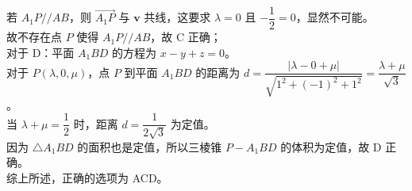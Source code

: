 {  若 \(A_1P // AB\)，则 \(\overrightarrow{A_1P}\) 与 \(\boldsymbol{v}\) 共线，这要求 \(\lambda = 0\) 且 \(-\dfrac{1}{2} = 0\)，显然不可能。\\
  故不存在点 \(P\) 使得 \(A_1P // AB\)，故 C 正确；\\
  对于 D：平面 \(A_1BD\) 的方程为 \(x-y+z=0\)。\\
  对于 \(P(\lambda, 0, \mu)\)，点 \(P\) 到平面 \(A_1BD\) 的距离为 \(d = \dfrac{|\lambda - 0 + \mu|}{\sqrt{1^2 + (-1)^2 + 1^2}} = \dfrac{\lambda+\mu}{\sqrt{3}}\)。\\
  当 \(\lambda+\mu = \dfrac{1}{2}\) 时，距离 \(d = \dfrac{1}{2\sqrt{3}}\) 为定值。\\
  因为 \(\triangle A_1BD\) 的面积也是定值，所以三棱锥 \(P-A_1BD\) 的体积为定值，故 D 正确。\\
  综上所述，正确的选项为 ACD。%
}
\newcommand{\qElevenDiagnosis}{\errortag{动态解析失效} 侧面动点问题是三维立体几何与平面解析几何的综合。学生常因无法建立合适的空间直角坐标系而导致定量计算（如法向量与体积判定）全凭感觉盲猜。}
\newcommand{\qElevenTeachingNotes}{讲解时重点突出空间向量的降维与映射，引导学生观察 \(\overrightarrow{BP} = \lambda \overrightarrow{BC} + \mu \overrightarrow{BB_1}\) 实质上限定了 \(P\) 在侧面平面上，再利用建系解析完成各选项的判断。}

\newcommand{\qTwelveStem}{某校高一年级有 \(900\) 名学生，现用比例分配的分层随机抽样方法抽取一个容量为 \(81\) 的样本，其中抽取男生和女生的人数分别为 \(45,36\)，则该校高一年级的女生人数为\blank{2.5cm}.}
\newcommand{\qTwelveAnswer}{400}
\newcommand{\qTwelveSolution}{%
  【解析】\\
  分层随机抽样中，每层抽取的比例等于该层人数占总体的比例。\\
  样本中女生比例为 \(\dfrac{36}{81} = \dfrac{4}{9}\)。\\
  所以该校高一年级女生人数为 \(900 \times \dfrac{4}{9} = 400\)。\\
  故填 400。%
}
\newcommand{\qTwelveDiagnosis}{\errortag{概念不牢} 极少数学生会将比例算反，算成 \(900 \times \dfrac{36}{45} = 720\)，即直接用男女比例代入计算。}
\newcommand{\qTwelveTeachingNotes}{强调分层抽样核心规律：\(\dfrac{\text{样本层容量}}{\text{样本总容量}} = \dfrac{\text{总体层容量}}{\text{总体总容量}}\)。}

